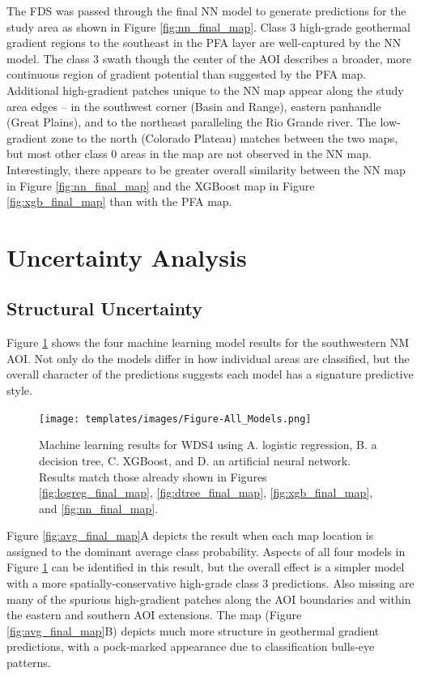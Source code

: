 The FDS was passed through the final NN model to generate predictions for the study area as shown in Figure \ref{fig:nn_final_map}. Class 3 high-grade geothermal gradient regions to the southeast in the \citet{bielicki_hydrogeolgic_2015} PFA layer are well-captured by the NN model. The class 3 swath though the center of the AOI describes a broader, more continuous region of gradient potential than suggested by the PFA map. Additional high-gradient patches unique to the NN map appear along the study area edges – in the southwest corner (Basin and Range), eastern panhandle (Great Plains), and to the northeast paralleling the Rio Grande river. The low-gradient zone to the north (Colorado Plateau) matches between the two maps, but most other class 0 areas in the \citeauthor{bielicki_hydrogeolgic_2015} map are not observed in the NN map. Interestingly, there appears to be greater overall similarity between the NN map in Figure \ref{fig:nn_final_map} and the XGBoost map in Figure \ref{fig:xgb_final_map} than with the PFA map.
\vfill
\section{Uncertainty Analysis}\label{ch5:uncertainty_analysis}
\subsection{Structural Uncertainty}\label{ch5:structural_uncertainty}
Figure \ref{fig:combined_maps} shows the four machine learning model results for the southwestern NM AOI. Not only do the models differ in how individual areas are classified, but the overall character of the predictions suggests each model has a signature predictive style.

\begin{figure}[!htp]
\centering
\texttt{[image: templates/images/Figure-All\_Models.png]}
\caption[Combined machine learning results]{Machine learning results for WDS4 using A. logistic regression, B. a decision tree, C. XGBoost, and D. an artificial neural network. Results match those already shown in Figures \ref{fig:logreg_final_map}, \ref{fig:dtree_final_map}, \ref{fig:xgb_final_map}, and \ref{fig:nn_final_map}.}
\label{fig:combined_maps}
\end{figure}

Figure \ref{fig:avg_final_map}A depicts the result when each map location is assigned to the dominant average class probability. Aspects of all four models in Figure \ref{fig:combined_maps} can be identified in this result, but the overall effect is a simpler model with a more spatially-conservative high-grade class 3 predictions. Also missing are many of the spurious high-gradient patches along the AOI boundaries and within the eastern and southern AOI extensions. The \citeauthor{bielicki_hydrogeolgic_2015} map (Figure \ref{fig:avg_final_map}B) depicts much more structure in geothermal gradient predictions, with a pock-marked appearance due to classification bulls-eye patterns.

